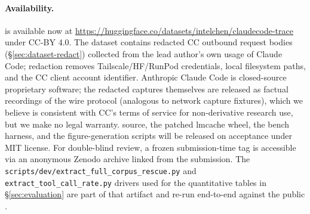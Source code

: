\paragraph{Availability.} \dataset{} is available now at
\url{https://huggingface.co/datasets/intelchen/claudecode-trace}
under CC-BY 4.0. The dataset contains redacted CC outbound request
bodies (\S\ref{sec:dataset-redact}) collected from the lead author's
own usage of Claude Code; redaction removes Tailscale/HF/RunPod
credentials, local filesystem paths, and the CC client account
identifier. Anthropic Claude Code is closed-source proprietary
software; the redacted captures themselves are released as factual
recordings of the wire protocol (analogous to network capture
fixtures), which we believe is consistent with CC's terms of
service for non-derivative research use, but we make no legal
warranty.
\sys{} source, the patched lmcache wheel, the bench harness, and
the figure-generation scripts will be released on acceptance under
MIT license. For double-blind review, a frozen submission-time tag
is accessible via an anonymous Zenodo archive linked from the
submission. The
\texttt{scripts/dev/\allowbreak{}extract\_\allowbreak{}full\_\allowbreak{}corpus\_\allowbreak{}rescue.py}
and \texttt{extract\_\allowbreak{}tool\_\allowbreak{}call\_\allowbreak{}rate.py}
drivers used for the quantitative tables in \S\ref{sec:evaluation}
are part of that artifact and re-run end-to-end against the public
\dataset{}.
